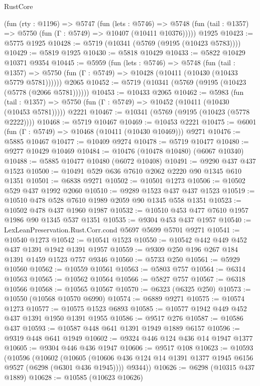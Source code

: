 \begin{lexlean}{RustCore}
\begin{coremodule}
    (fun (rty : @1196) =>
    @5747
      (fun (lets : @5746) =>
      @5748 (fun (tail : @1357) => @5750 (fun (Γ : @5749) => @10407 (@10411 @10376)))))
    @1925
@10423 := @5775 @1925
@10428 := @5719 (@10341 (@5769 (@9195 (@10423 @5783))))
@10429 := @5819 @1925
@10430 := @5818 @10429
@10433 := @5822 @10429 @10371 @9354
@10445 := @5959
    (fun (lets : @5746) =>
    @5748
      (fun (tail : @1357) =>
      @5750 (fun (Γ : @5749) => @10428 (@10411 (@10430 (@10433 @5779 @5781))))))
    @2065
@10452 := @5719 (@10341 (@5769 (@9195 (@10423 (@5778 (@2066 @5781))))))
@10453 := @10433 @2065
@10462 := @5983
    (fun (tail : @1357) => @5750 (fun (Γ : @5749) => @10452 (@10411 (@10430 (@10453 @5781)))))
    @2221
@10467 := @10341 (@5769 (@9195 (@10423 (@5778 @2222))))
@10468 := @5719 @10467
@10469 := @10453 @2221
@10475 := @6001 (fun (Γ : @5749) => @10468 (@10411 (@10430 @10469))) @9271
@10476 := @5885 @10467
@10477 := @10409 @9274
@10478 := @5719 @10477
@10480 := @9277 @10429 @10469
@10484 := @10476 (@10478 @10480) (@6067 @10340)
@10488 := @5885 @10477 @10480 (@6072 @10408)
@10491 := @9290 @437 @437 @1523
@10500 := @10491 @529 @636 @7610 @2062 @2220 @90 @1345 @610 @1351
@10501 := @6838 @9271
@10502 := @10501 @1273
@10506 := @10502 @529 @437 @1992 @2060
@10510 := @9289 @1523 @437 @437 @1523
@10519 := @10510 @478 @528 @7610 @1989 @2059 @90 @1345 @558 @1351
@10523 := @10502 @478 @437 @1960 @1987
@10532 := @10510 @453 @477 @7610 @1957 @1986 @90 @1345 @537 @1351
@10535 := @9304 @453 @437 @1957
@10540 := LexLeanPreservation.Rust.Corr.cond @5697 @5699 @5701 @9271
@10541 := @10540 @1273
@10542 := @10541 @1523
@10550 := @10542 @442 @449 @452 @437 @1391 @1942 @1391 @1957
@10559 := @9309 @250 @196 @267 @184 @1391 @1459 @1523 @757 @9346
@10560 := @5733 @250
@10561 := @5929 @10560
@10562 := @10559 @10561
@10563 := @5803 @757
@10564 := @6314 @10563
@10565 := @10562 @10564
@10566 := @5827 @757
@10567 := @6318 @10566
@10568 := @10565 @10567
@10570 := @6323 (@6325 @250)
@10573 := @10550 (@10568 @10570 @6990)
@10574 := @6889 @9271
@10575 := @10574 @1273
@10577 := @10575 @1523 @6893
@10585 := @10577 @1942 @449 @452 @437 @1391 @1950 @1391 @1955
@10586 := @9517 @276
@10587 := @10586 @437
@10593 := @10587 @448 @641 @1391 @1949 @1889 @6157
@10596 := @9319 @448 @641 @1949
@10602 := @9324 @446 @124 @436 @14 @1947 @1377
@10605 := @9304 @446 @436 @1947
@10606 := @9517 @108
@10623 := @10593
    (@10596
      (@10602
        (@10605 (@10606 @436 @124 @14 @1391 @1377 @1945 @6156 @9527 (@6298 (@6301 @436 @1945))))
        @9344))
@10626 := @6298 (@10315 @437 @1889)
@10628 := @10585 (@10623 @10626)

\end{coremodule}
\end{lexlean}
